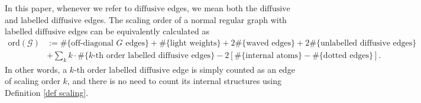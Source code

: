 \documentclass{article}
\newcommand{\1}{\mathds{1}}
\numberwithin{equation}{section}
\renewcommand{\cal}{\mathcal}
\newcommand{\dashed}{\text{diffusive}}
\newcommand{\selfs}{\text{self-energies}}
\theoremstyle{plain} %
\theoremstyle{remark}
\newtheorem{remark}[theorem]{Remark}
\newcommand{\Sele}{{\mathcal E}}
\newcommand{\Selek}{{\mathcal E}}
\begin{document}
%

In this paper, whenever we refer to $\dashed$ edges, we mean both the $\dashed$ and labelled $\dashed$ edges. The scaling order of a normal regular graph with labelled $\dashed$ edges can be equivalently calculated as
\begin{align}
	\text{ord}(\cal G) &:= \#\{\text{off-diagonal }  G  \text{ edges}\} + \#\{\text{light weights}\} + 2\#\{ \text{waved edges}\}  + 2 \#\{\text{unlabelled $\dashed$ edges}\} \nonumber\\
	&+\sum_k k\cdot   \#\{k\text{-th order labelled $\dashed$ edges}\}  -  2\left[ \#\{\text{internal atoms}\}- \#\{\text{dotted edges}\} \right] .\label{eq_deforderrandom3}
\end{align}
In other words, a $k$-th order labelled $\dashed$ edge is simply counted as an edge of scaling order $k$, and there is no need to count its internal structures using Definition \ref{def scaling}.
\end{document}
